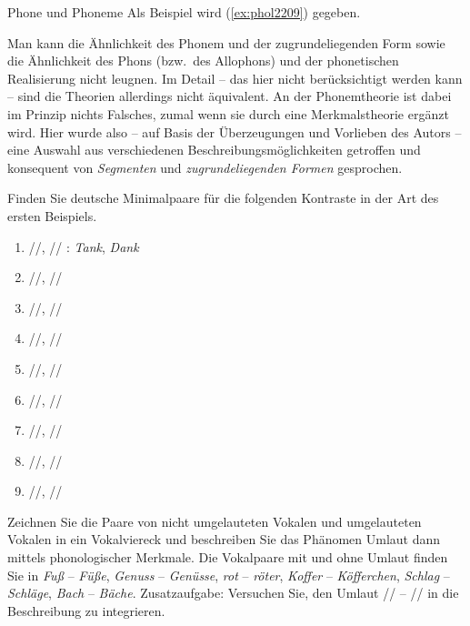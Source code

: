 \begin{Vertiefung}{Phone und Phoneme}
Als Beispiel wird (\ref{ex:phol2209}) gegeben.

\begin{exe}
  \ex\label{ex:phol2209}
  \begin{xlist}
  \end{xlist}
\end{exe}

Man kann die Ähnlichkeit des Phonem und der zugrundeliegenden Form sowie die Ähnlichkeit des Phons (bzw.\ des Allophons) und der phonetischen Realisierung nicht leugnen.
Im Detail -- das hier nicht berücksichtigt werden kann -- sind die Theorien allerdings nicht äquivalent.
An der Phonemtheorie ist dabei im Prinzip nichts Falsches, zumal wenn sie durch eine Merkmalstheorie ergänzt wird.
Hier wurde also -- auf Basis der Überzeugungen und Vorlieben des Autors -- eine Auswahl aus verschiedenen Beschreibungsmöglichkeiten getroffen und konsequent von \textit{Segmenten} und \textit{zugrundeliegenden Formen} gesprochen.

\end{Vertiefung}


\Uebungen

\Uebung \label{u41} Finden Sie deutsche Minimalpaare für die folgenden Kontraste in der Art des ersten Beispiels.

\begin{enumerate}\Lf
  \item{//, // : \textit{Tank}, \textit{Dank}}
  \item{//, //}
  \item{//, //}
  \item{//, //}
  \item{//, //}
  \item{//, //}
  \item{//, //}
  \item{//, //}
  \item{//, //}
\end{enumerate}

\Uebung \label{u42} Zeichnen Sie die Paare von nicht umgelauteten Vokalen und umgelauteten Vokalen in ein Vokalviereck und beschreiben Sie das Phänomen Umlaut dann mittels phonologischer Merkmale.
Die Vokalpaare mit und ohne Umlaut finden Sie in \textit{Fuß} -- \textit{Füße}, \textit{Genuss} -- \textit{Genüsse}, \textit{rot} -- \textit{röter}, \textit{Koffer} -- \textit{Köfferchen}, \textit{Schlag} -- \textit{Schläge}, \textit{Bach} -- \textit{Bäche}.
Zusatzaufgabe: Versuchen Sie, den Umlaut // -- // in die Beschreibung zu integrieren.

